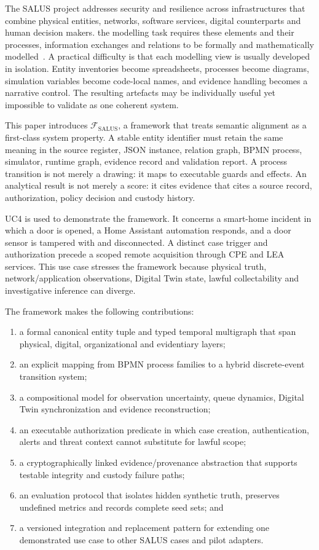 ﻿\documentclass[10pt,a4paper,twocolumn]{article}
\newcommand{\Framework}{\mathcal{F}_{\mathrm{SALUS}}}
\begin{document}
The SALUS project addresses security and resilience across infrastructures that combine physical entities, networks, software services, digital counterparts and human decision makers. the modelling task requires these elements and their processes, information exchanges and relations to be formally and mathematically modelled~\cite{salusproposal}. A practical difficulty is that each modelling view is usually developed in isolation. Entity inventories become spreadsheets, processes become diagrams, simulation variables become code-local names, and evidence handling becomes a narrative control. The resulting artefacts may be individually useful yet impossible to validate as one coherent system.

This paper introduces \(\Framework\), a framework that treats semantic alignment as a first-class system property. A stable entity identifier must retain the same meaning in the source register, JSON instance, relation graph, BPMN process, simulator, runtime graph, evidence record and validation report. A process transition is not merely a drawing: it maps to executable guards and effects. An analytical result is not merely a score: it cites evidence that cites a source record, authorization, policy decision and custody history.

UC4 is used to demonstrate the framework. It concerns a smart-home incident in which a door is opened, a Home Assistant automation responds, and a door sensor is tampered with and disconnected. A distinct case trigger and authorization precede a scoped remote acquisition through CPE and LEA services. This use case stresses the framework because physical truth, network/application observations, Digital Twin state, lawful collectability and investigative inference can diverge.

The framework makes the following contributions:

\begin{enumerate}
  \item a formal canonical entity tuple and typed temporal multigraph that span physical, digital, organizational and evidentiary layers;
  \item an explicit mapping from BPMN process families to a hybrid discrete-event transition system;
  \item a compositional model for observation uncertainty, queue dynamics, Digital Twin synchronization and evidence reconstruction;
  \item an executable authorization predicate in which case creation, authentication, alerts and threat context cannot substitute for lawful scope;
  \item a cryptographically linked evidence/provenance abstraction that supports testable integrity and custody failure paths;
  \item an evaluation protocol that isolates hidden synthetic truth, preserves undefined metrics and records complete seed sets; and
  \item a versioned integration and replacement pattern for extending one demonstrated use case to other SALUS cases and pilot adapters.
\end{enumerate}
\end{document}
